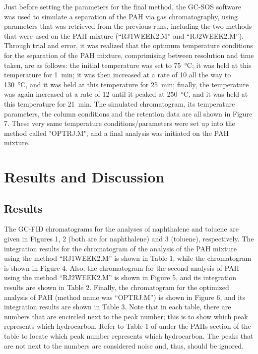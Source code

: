 \documentclass[a4paper, 12pt]{article}
\begin{document}
Just before setting the parameters for the final method, the GC-SOS\textsuperscript{\textregistered} software was used to simulate a separation of the PAH via gas chromatography, using parameters that was retrieved from the previous runs, including the two methods that were used on the PAH mixture (``RJ1WEEK2.M'' and ``RJ2WEEK2.M''). Through trial and error, it was realized that the optimum temperature conditions for the separation of the PAH mixture, comprimising between resolution and time taken, are as follows: the initial temperature was set to \SI{75}{\degreeCelsius}; it was held at this temperature for \SI{1}{min}; it was then increased at a rate of \SI{10}{} all the way to \SI{130}{\degreeCelsius}, and it was held at this temperature for \SI{25}{min}; finally, the temperature was again increased at a rate of \SI{12}{} until it peaked at \SI{250}{\degreeCelsius}, and it was held at this temperature for \SI{21}{min}. The simulated chromatogram, its temperature parameters, the column conditions and the retention data are all shown in Figure 7. These very same temperature conditions/parameters were set up into the method called "OPTRJ.M", and a final analysis was initiated on the PAH mixture.


\section{Results and Discussion}

\subsection{Results}
The GC-FID chromatograms for the analyses of naphthalene and toluene are given in Figures 1, 2 (both are for naphthalene) and 3 (toluene), respectively. The integration results for the chromatogram of the analysis of the PAH mixture using the method ``RJ1WEEK2.M'' is shown in Table 1, while the chromatogram is shown in Figure 4. Also, the chromatogram for the second analysis of PAH using the method ``RJ2WEEK2.M'' is shown in Figure 5, and its integration results are shown in Table 2. Finally, the chromatogram for the optimized analysis of PAH (method name was ``OPTRJ.M'') is shown in Figure 6, and its integration results are shown in Table 3. Note that in each table, there are numbers that are encircled next to the peak number; this is to show which peak represents which hydrocarbon. Refer to Table 1 of \cite{sft-pah} under the PAHs section of the table to locate which peak number represents which hydrocarbon. The peaks that are not next to the numbers are considered noise and, thus, should be ignored.
\end{document}
